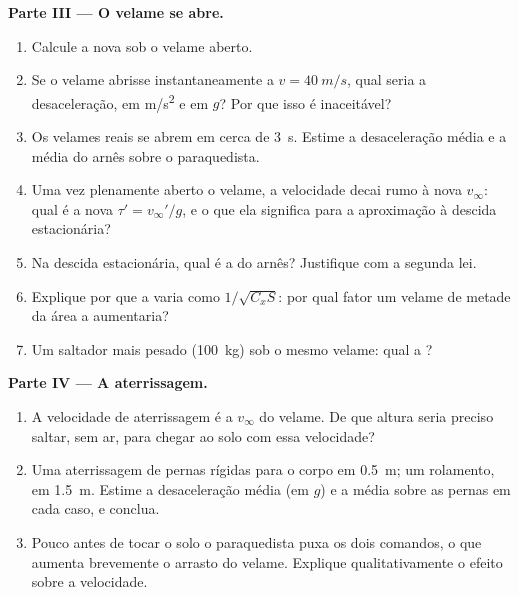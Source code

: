 \begin{problem}
\medskip
\noindent\textbf{Parte III --- O velame se abre.}
\begin{enumerate}[resume]
  \item Calcule a nova  sob o velame aberto.
  \item Se o velame abrisse instantaneamente a $v = \qty{40}{m/s}$, qual
        seria a desaceleração, em \unit{m/s^2} e em $g$? Por que
        isso é inaceitável?
  \item Os velames reais se abrem em cerca de \qty{3}{s}. Estime a
        desaceleração média e a  média do arnês sobre o
        paraquedista.
  \item Uma vez plenamente aberto o velame, a velocidade decai rumo à nova
        $v_\infty$: qual é a nova  $\tau' = v_\infty'/g$,
        e o que ela significa para a aproximação à descida estacionária?
  \item Na descida estacionária, qual é a  do arnês? Justifique com a
        segunda lei.
  \item Explique por que a  varia como $1/\sqrt{C_xS}$: por
        qual fator um velame de metade da área a aumentaria?
  \item Um saltador mais pesado (\qty{100}{kg}) sob o mesmo velame: qual a ?
\end{enumerate}

\medskip
\noindent\textbf{Parte IV --- A aterrissagem.}
\begin{enumerate}[resume]
  \item A velocidade de aterrissagem é a $v_\infty$ do velame. De que altura
        seria preciso saltar, sem ar, para chegar ao solo com essa
        velocidade?
  \item Uma aterrissagem de pernas rígidas para o corpo em \qty{0.5}{m}; um rolamento,
        em \qty{1.5}{m}. Estime a desaceleração média (em $g$) e
        a  média sobre as pernas em cada caso, e conclua.
  \item Pouco antes de tocar o solo o paraquedista puxa os dois comandos,
        o que aumenta brevemente o arrasto do velame. Explique qualitativamente
        o efeito sobre a velocidade.
\end{enumerate}


\end{problem}
